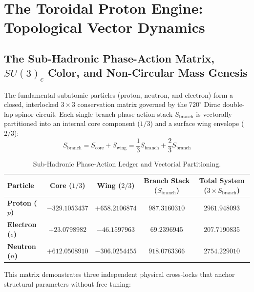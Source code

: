 \documentclass[11pt,a4paper]{article}
\begin{document}
	\section{The Toroidal Proton Engine: Topological Vector Dynamics}
	\subsection{The Sub-Hadronic Phase-Action Matrix, $SU(3)_c$ Color, and Non-Circular Mass Genesis}
	
	The fundamental subatomic particles (proton, neutron, and electron) form a closed, interlocked $3 \times 3$ conservation matrix governed by the $720^\circ$ Dirac double-lap spinor circuit. Each single-branch phase-action stack $S_{\text{branch}}$ is vectorally partitioned into an internal core component ($1/3$) and a surface wing envelope ($2/3$):
	\begin{equation}
		S_{\text{branch}} = S_{\text{core}} + S_{\text{wing}} = \frac{1}{3}S_{\text{branch}} + \frac{2}{3}S_{\text{branch}}
	\end{equation}
	
	\begin{table}[H]
		\centering
		\caption{Sub-Hadronic Phase-Action Ledger and Vectorial Partitioning.}
		\label{tab:action_matrix}
		\begin{tabular}{lcccc}
			\toprule
			\textbf{Particle} & \textbf{Core ($1/3$)} & \textbf{Wing ($2/3$)} & \textbf{Branch Stack ($S_{\text{branch}}$)} & \textbf{Total System ($3 \times S_{\text{branch}}$)} \\
			\midrule
			\textbf{Proton ($p$)}   & $-329.1053437$ & $+658.2106874$ & $987.3160310$ & $2961.948093$ \\
			\textbf{Electron ($e$)} & $+23.0798982$  & $-46.1597963$  & $69.2396945$  & $207.7190835$ \\
			\textbf{Neutron ($n$)}  & $+612.0508910$ & $-306.0254455$ & $918.0763366$ & $2754.229010$ \\
			\bottomrule
		\end{tabular}
	\end{table}
	
	This matrix demonstrates three independent physical cross-locks that anchor structural parameters without free tuning:
	
\end{document}

